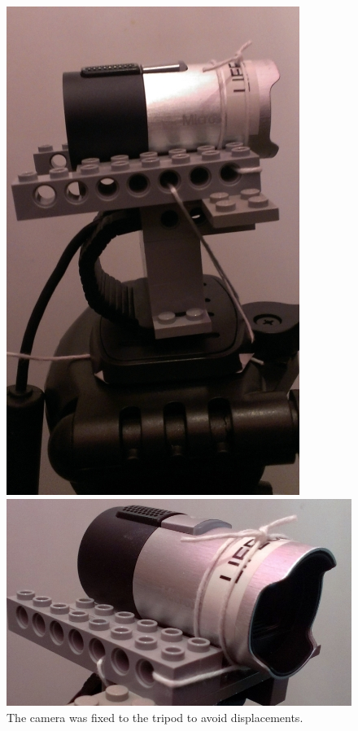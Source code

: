 \documentclass{scrartcl}
\begin{document}
\begin{figure}[H]
\centering
\begin{minipage}{.5\textwidth}
  \centering
  \includegraphics[width=.47\linewidth]{img/fixation_1.jpg}
\end{minipage}%
\begin{minipage}{.5\textwidth}
  \centering
  \includegraphics[width=1.3\linewidth]{img/fixation_2.jpg}
\end{minipage}
\caption{The camera was fixed to the tripod to avoid displacements.}
\label{fig:fixation}
\end{figure}




\end{document}
